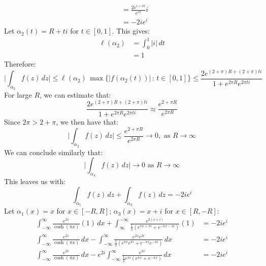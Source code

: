 \documentclass[letterpaper, titlepage, DIV=14]{scrartcl}
\begin{document}
\begin{enumerate}[i)]
\begin{align*}
        &= \frac{2e^{i+i\pi}}{e^{i\pi}} i \\
        &= -2ie^{i}
    \end{align*}
    Let $\alpha_{2}(t) = R + ti$ for $t\in[0,1]$. This gives:
    \begin{align*}
      \ell(\alpha_{2}) &= \int_{0}^{1} |i| \, dt \\
        &= 1
    \end{align*}
    Therefore:
    \begin{equation*}
      \Big|\int_{\alpha_{2}} f(z) \, dz \Big| \leq \ell(\alpha_{2}) \, \max\{|f(\alpha_{2}(t))| \, : \, t\in[0,1]\} \leq \frac{2e^{(2+\pi)R + (2+\pi)ti}}{1+e^{2\pi R}e^{2\pi ti}}
    \end{equation*}
    For large $R$, we can estimate that:
    \begin{equation*}
      \frac{2e^{(2+\pi)R + (2+\pi)ti}}{1+e^{2\pi R}e^{2\pi ti}} \approx \frac{e^{2+\pi R}}{e^{2\pi R}}
    \end{equation*}
    Since $2\pi > 2+\pi$, we then have that:
    \begin{equation*}
      \Big|\int_{\alpha_{2}} f(z) \, dz \Big| \leq \frac{e^{2+\pi R}}{e^{2\pi R}} \to 0, \text{ as } R\to\infty
    \end{equation*}
    We can conclude similarly that:
    \begin{equation*}
      \Big|\int_{\alpha_{4}} f(z) \, dz \Big| \to 0 \text{ as } R\to\infty
    \end{equation*}
    This leaves us with:
    \begin{equation*}
      \int_{\alpha_{1}} f(z) \, dz + \int_{\alpha_{3}} f(z) \, dz = -2ie^{i}
    \end{equation*}
    Let $\alpha_{1}(x)=x$ for $x\in[-R,R]$; $\alpha_{3}(x)=x + i$ for $x\in[R,-R]$:
    \begin{align*}
      \int_{-\infty}^{\infty} \frac{e^{2x}}{\cosh(\pi x)} (1) \, dx + \int_{\infty}^{-\infty} \frac{e^{2(x+i)}}{\frac{1}{2}(e^{\pi x+\pi i}+e^{-\pi x-\pi i})}(1) &= -2ie^{i} \\
      \int_{-\infty}^{\infty} \frac{e^{2x}}{\cosh(\pi x)} \, dx - \int_{-\infty}^{\infty} \frac{e^{2x}e^{2i}}{\frac{1}{2}(e^{\pi x}e^{\pi i}+e^{-\pi x}e^{-\pi i})} \, dx &= -2ie^{i} \\
      \int_{-\infty}^{\infty} \frac{e^{2x}}{\cosh(\pi x)} \, dx - e^{2i}\int_{-\infty}^{\infty} \frac{e^{2x}}{\frac{1}{2}e^{\pi i}(e^{\pi x}+e^{-\pi x})} \, dx &= -2ie^{i} 
    \end{align*}
    \begin{gather*}

\end{gather*}
\end{enumerate}
\end{document}
